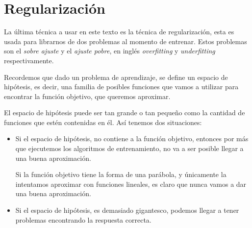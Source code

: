 \section{Regularización}

La última técnica a usar en este texto es la técnica de regularización, esta es usada para librarnos de dos problemas al momento de entrenar. Estos problemas son el \textit{sobre ajuste} y el \textit{ajuste pobre}, en inglés \emph{overfitting} y \emph{underfitting} respectivamente.

Recordemos que dado un problema de aprendizaje, se define un espacio de hipótesis, es decir, una familia de posibles funciones que vamos a utilizar para encontrar la función objetivo, que queremos aproximar. 

El espacio de hipótesis puede ser tan grande o tan pequeño como la cantidad de funciones que estén contenidas en él. Así tenemos dos situaciones:
\begin{itemize}
 \item Si el espacio de hipótesis, no contiene a la función objetivo, entonces por más que ejecutemos los algoritmos de entrenamiento, no va a ser posible llegar a una buena aproximación.
 \begin{example}
  Si la función objetivo tiene la forma de una parábola, y únicamente la intentamos aproximar con funciones lineales, es claro que nunca vamos a dar una buena aproximación.
 \end{example}

 \item Si el espacio de hipótesis, es demasiado gigantesco, podemos llegar a tener problemas encontrando la respuesta correcta. 
\end{itemize}

